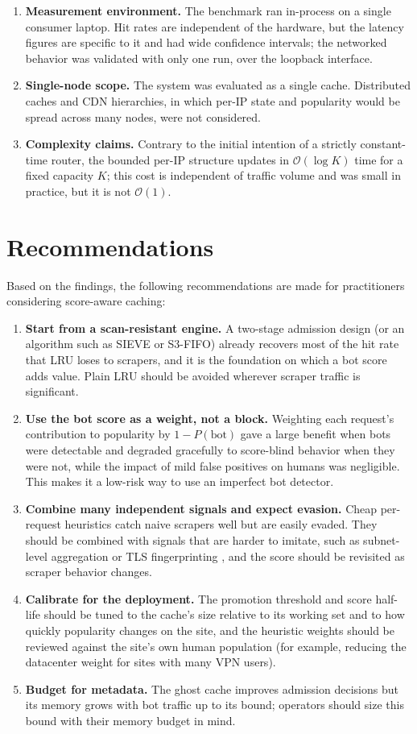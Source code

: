 \begin{enumerate}
    \item \textbf{Measurement environment.} The benchmark ran in-process on a single consumer laptop. Hit rates are independent of the hardware, but the latency figures are specific to it and had wide confidence intervals; the networked behavior was validated with only one run, over the loopback interface.
    \item \textbf{Single-node scope.} The system was evaluated as a single cache. Distributed caches and CDN hierarchies, in which per-IP state and popularity would be spread across many nodes, were not considered.
    \item \textbf{Complexity claims.} Contrary to the initial intention of a strictly constant-time router, the bounded per-IP structure updates in $\mathcal{O}(\log K)$ time for a fixed capacity $K$; this cost is independent of traffic volume and was small in practice, but it is not $\mathcal{O}(1)$.
\end{enumerate}

\section{Recommendations}
Based on the findings, the following recommendations are made for practitioners considering score-aware caching:
\begin{enumerate}
    \item \textbf{Start from a scan-resistant engine.} A two-stage admission design (or an algorithm such as SIEVE or S3-FIFO) already recovers most of the hit rate that LRU loses to scrapers, and it is the foundation on which a bot score adds value. Plain LRU should be avoided wherever scraper traffic is significant.
    \item \textbf{Use the bot score as a weight, not a block.} Weighting each request's contribution to popularity by $1 - P(\text{bot})$ gave a large benefit when bots were detectable and degraded gracefully to score-blind behavior when they were not, while the impact of mild false positives on humans was negligible. This makes it a low-risk way to use an imperfect bot detector.
    \item \textbf{Combine many independent signals and expect evasion.} Cheap per-request heuristics catch naive scrapers well but are easily evaded. They should be combined with signals that are harder to imitate, such as subnet-level aggregation \cite{hoetzlein_protecting_2025} or TLS fingerprinting \cite{martinez_llamas_balancing_2025}, and the score should be revisited as scraper behavior changes.
    \item \textbf{Calibrate for the deployment.} The promotion threshold and score half-life should be tuned to the cache's size relative to its working set and to how quickly popularity changes on the site, and the heuristic weights should be reviewed against the site's own human population (for example, reducing the datacenter weight for sites with many VPN users).
    \item \textbf{Budget for metadata.} The ghost cache improves admission decisions but its memory grows with bot traffic up to its bound; operators should size this bound with their memory budget in mind.
\end{enumerate}

